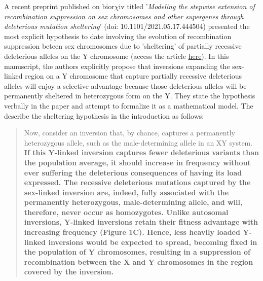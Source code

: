 \documentclass{article}
\begin{document}
\begin{appendices}
A recent preprint published on bior$\chi$iv titled '{\itshape Modeling the stepwise extension of recombination suppression on sex chromosomes and other supergenes through deleterious mutation sheltering}' (doi: 10.1101/2021.05.17.444504) presented the most explicit hypothesis to date involving the evolution of recombination suppression beteen sex chromosomes due to 'sheltering' of partially recessive deleterious alleles on the Y chromosome (access the article \href{https://www.biorxiv.org/content/10.1101/2021.05.17.444504v1.article-info}{\color{blue} here}). In this manuscript, the authors explicitly propose that inversions expanding the sex-linked region on a Y chromosome that capture partially recessive deleterious alleles will enjoy a selective advantage because those deleterious alleles will be permanently sheltered in heterozygous form on the Y. They state the hypothesis verbally in the paper and attempt to formalize it as a mathematical model. The describe the sheltering hypothesis in the introduction as follows:

	\begin{quote}
		Now, consider an inversion that, by chance, captures a permanently heterozygous allele, such as the male-determining allele in an XY system. {\bf If this Y-linked inversion captures fewer deleterious variants than the population average, it should increase in frequency without ever suffering the deleterious consequences of having its load expressed. The recessive deleterious mutations captured by the sex-linked inversion are, indeed, fully associated with the permanently heterozygous, male-determining allele, and will, therefore, never occur as homozygotes. Unlike autosomal inversions, Y-linked inversions retain their fitness advantage with increasing frequency (Figure 1C). Hence, less heavily loaded Y-linked inversions would be expected to spread, becoming fixed in the population of Y chromosomes, resulting in a suppression of recombination between the X and Y chromosomes in the region covered by the inversion.}
	\end{quote}


\end{appendices}
\end{document}
